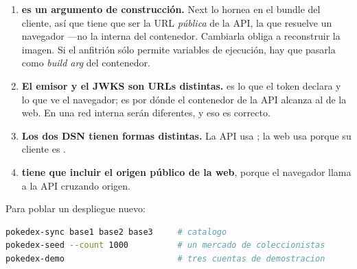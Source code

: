 \begin{enumerate}[leftmargin=1.4em,itemsep=4pt,topsep=3pt]
  \item \textbf{ es un argumento de construcción.}
        Next lo hornea en el bundle del cliente, así que tiene que ser la URL
        \emph{pública} de la API, la que resuelve un navegador —no la interna del
        contenedor. Cambiarla obliga a reconstruir la imagen. Si el anfitrión
        sólo permite variables de ejecución, hay que pasarla como
        \emph{build arg} del contenedor.
  \item \textbf{El emisor y el JWKS son URLs distintas.}  es
        lo que el token declara y lo que ve el navegador; 
        es por dónde el contenedor de la API alcanza al de la web. En una red
        interna serán diferentes, y eso es correcto.
  \item \textbf{Los dos DSN tienen formas distintas.} La API usa
        ; la web usa  porque
        su cliente es .
  \item \textbf{ tiene que incluir el origen público de la
        web}, porque el navegador llama a la API cruzando origen.
\end{enumerate}

Para poblar un despliegue nuevo:

\begin{lstlisting}[language=bash]
pokedex-sync base1 base2 base3     # catalogo
pokedex-seed --count 1000          # un mercado de coleccionistas
pokedex-demo                       # tres cuentas de demostracion
\end{lstlisting}

